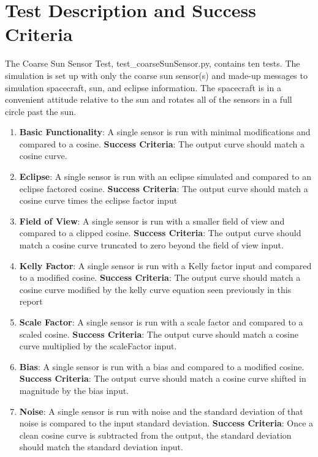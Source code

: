
\section{Test Description and Success Criteria}
The Coarse Sun Sensor Test, test\_coarseSunSensor.py, contains ten tests. The simulation is set up with only the coarse sun sensor(s) and made-up messages to simulation spacecraft, sun, and eclipse information. The spacecraft is in a convenient attitude relative to the sun and rotates all of the sensors in a full circle past the sun.
\begin{enumerate}
	\item\textbf{Basic Functionality}: A single sensor is run with minimal modifications and compared to a cosine.
	\subitem \textbf{Success Criteria}: The output curve should match a cosine curve.
	\item\textbf{Eclipse}: A single sensor is run with an eclipse simulated and compared to an eclipse factored cosine.
	\subitem \textbf{Success Criteria}: The output curve should match a cosine curve times the eclipse factor input
	\item\textbf{Field of View}: A single sensor is run with a smaller field of view and compared to a clipped cosine.
	\subitem \textbf{Success Criteria}: The output curve should match a cosine curve truncated to zero beyond the field of view input.
	\item\textbf{Kelly Factor}: A single sensor is run with a Kelly factor input and compared to a modified cosine.
	\subitem \textbf{Success Criteria}: The output curve should match a cosine curve modified by the kelly curve equation seen previously in this report
	\item\textbf{Scale Factor}: A single sensor is run with a scale factor and compared to a scaled cosine.
	\subitem \textbf{Success Criteria}: The output curve should match a cosine curve multiplied by the scaleFactor input.
	\item\textbf{Bias}: A single sensor is run with a bias and compared to a modified cosine.
	\subitem \textbf{Success Criteria}: The output curve should match a cosine curve shifted in magnitude by the bias input.
	\item\textbf{Noise}: A single sensor is run with noise and the standard deviation of that noise is compared to the input standard deviation.
	\subitem \textbf{Success Criteria}: Once a clean cosine curve is subtracted from the output, the standard deviation should match the standard deviation input.

\end{enumerate}
